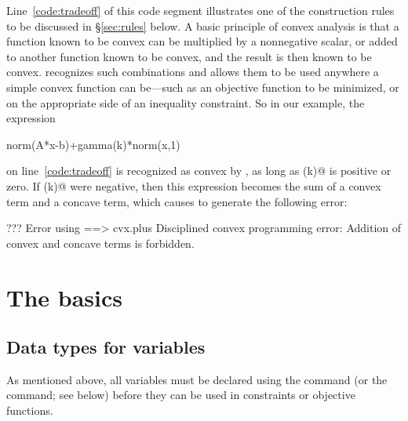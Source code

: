 \documentclass[12pt]{article}
\begin{document}
Line~\ref{code:tradeoff} of this code segment illustrates one of the
construction rules to be discussed in \S\ref{sec:rules} below. A basic
principle of convex analysis is that a function known
to be convex can be multiplied by a nonnegative scalar,
or added to another function known to be convex, and the result
is then known to be convex. \cvx recognizes such combinations and allows
them to be used anywhere a simple convex function can be---such as an objective
function to be minimized, or on the appropriate side of an inequality
constraint. So in our example, the expression
\begin{code}
	norm(A*x-b)+gamma(k)*norm(x,1)
\end{code}
on line~\ref{code:tradeoff}
is recognized as convex by \cvx, as long as \verb@gamma(k)@
is positive or zero. If \verb@gamma(k)@ were negative, then
this expression becomes the sum of a convex term and a concave
term, which causes \cvx
to generate the following error:
\begin{code}
??? Error using ==> cvx.plus
Disciplined convex programming error:
Addition of convex and concave terms is forbidden.
\end{code}

\section{The basics}

\subsection{Data types for variables}

As mentioned above, all variables must be declared using the \verb@variable@
command (or the \verb@variables@ command; see below) before they can be
used in constraints or objective functions. 
\end{document}
